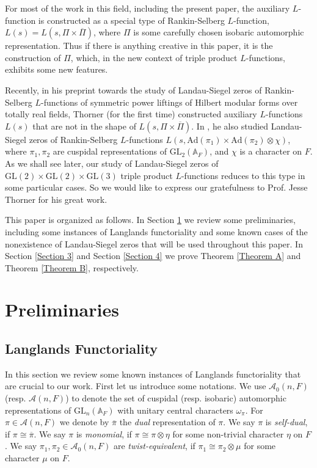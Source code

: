 \documentclass[12pt]{amsart}
\newcommand{\bA}{\mathbb{A}}
\newcommand{\Ad}{\text{Ad}}
\newcommand{\GL}{\text{GL}}
\newcommand{\cA}{\mathcal{A}}
\newcommand{\ov}{\overline}
\begin{document}
For most of the work in this field, including the present paper, the auxiliary $L$-function is constructed as a special type of Rankin-Selberg $L$-function, $L(s) = L(s,\Pi \times \ov{\Pi})$, where $\Pi$ is some carefully chosen isobaric automorphic representation. Thus if there is anything creative in this paper, it is the construction of $\Pi$, which, in the new context of triple product $L$-functions, exhibits some new features.  

Recently, in his preprint \cite{Thorner2025} towards the study of Landau-Siegel zeros of Rankin-Selberg $L$-functions of symmetric power liftings of Hilbert modular forms over totally real fields, Thorner (for the first time) constructed auxiliary $L$-functions $L(s)$ that are not in the shape of $L(s,\Pi \times \ov{\Pi})$. In \cite{Thorner2025symmetricsquare}, he also studied Landau-Siegel zeros of Rankin-Selberg $L$-functions $L(s,\Ad(\pi_1) \times \Ad(\pi_2) \otimes \chi)$, where $\pi_1,\pi_2$ are cuspidal representations of $\GL_2(\bA_F)$, and $\chi$ is a character on $F$. As we shall see later, our study of Landau-Siegel zeros of $\GL(2) \times \GL(2) \times \GL(3)$ triple product $L$-functions reduces to this type in some particular cases. So we would like to express our gratefulness to Prof. Jesse Thorner for his great work. 

This paper is organized as follows. In Section \ref{Section 2} we review some preliminaries, including some instances of Langlands functoriality and some known cases of the nonexistence of Landau-Siegel zeros that will be used throughout this paper. In Section \ref{Section 3} and Section \ref{Section 4} we prove Theorem \ref{Theorem A} and Theorem \ref{Theorem B}, respectively. 



\section{Preliminaries}\label{Section 2}

\subsection{Langlands Functoriality}
In this section we review some known instances of Langlands functoriality that are crucial to our work. First let us introduce some notations. We use $\cA_0(n,F)$ (resp. $\cA(n,F)$) to denote the set of cuspidal (resp. isobaric) automorphic representations of $\GL_n(\bA_F)$ with unitary central characters $\omega_\pi$. For $\pi \in \cA(n,F)$ we denote by $\ov{\pi}$ the \textit{dual} representation of $\pi$. We say $\pi$ is \textit{self-dual}, if $\pi \cong \ov{\pi}$. We say $\pi$ is \textit{monomial}, if $\pi \cong \pi \otimes \eta$ for some non-trivial character $\eta$ on $F$. We say $\pi_1,\pi_2 \in \cA_0(n,F)$ are \textit{twist-equivalent}, if $\pi_1 \cong \pi_2 \otimes \mu$ for some character $\mu$ on $F$.
\end{document}
